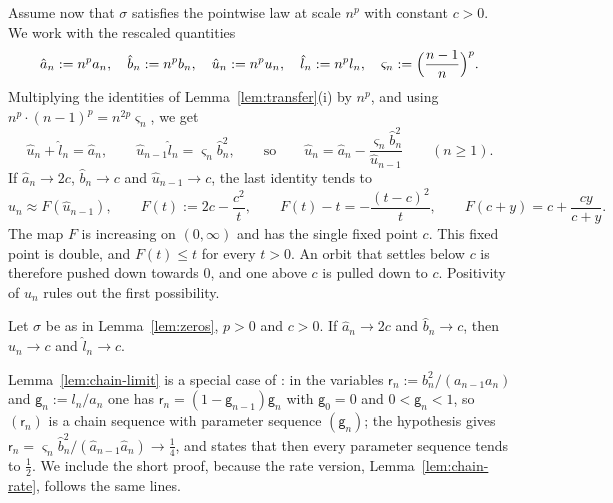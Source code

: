 Assume now that $\sigma$ satisfies the pointwise law at scale $n^p$ with constant $c>0$. We work with the rescaled
quantities
\[
  \hat a_n:=n^pa_n,\quad \hat b_n:=n^pb_n,\quad \hat u_n:=n^pu_n,\quad \hat l_n:=n^pl_n,\quad
  \varsigma_n:=\Bigl(\frac{n-1}n\Bigr)^p .
\]
Multiplying the identities of Lemma~\ref{lem:transfer}(i) by $n^p$, and using $n^p\cdot(n-1)^p=n^{2p}\varsigma_n$, we
get
\begin{equation}\label{eq:scaled-chain}
  \hat u_n+\hat l_n=\hat a_n,\qquad \hat u_{n-1}\hat l_n=\varsigma_n\hat b_n^2,\qquad\text{so}\qquad
  \hat u_n=\hat a_n-\frac{\varsigma_n\hat b_n^2}{\hat u_{n-1}}\qquad(n\ge1).
\end{equation}
If $\hat a_n\to2c$, $\hat b_n\to c$ and $\hat u_{n-1}\to c$, the last identity tends to
\begin{equation}\label{eq:chain-map}
  \hat u_n\approx F(\hat u_{n-1}),\qquad F(t):=2c-\frac{c^2}t,\qquad
  F(t)-t=-\frac{(t-c)^2}t,\qquad F(c+y)=c+\frac{cy}{c+y}.
\end{equation}
The map $F$ is increasing on $(0,\infty)$ and has the single fixed point $c$. This fixed point is double, and
$F(t)\le t$ for every $t>0$. An orbit that settles below $c$ is therefore pushed down towards $0$, and one above $c$ is pulled down
to $c$. Positivity of $u_n$ rules out the first possibility.

\begin{lemma}\label{lem:chain-limit}
Let $\sigma$ be as in Lemma~\ref{lem:zeros}, $p>0$ and $c>0$. If $\hat a_n\to2c$ and $\hat b_n\to c$, then
$\hat u_n\to c$ and $\hat l_n\to c$.
\end{lemma}

Lemma~\ref{lem:chain-limit} is a special case of \cite[Proposition~2.1]{DPQ}: in the variables
$\mathsf r_n:=b_n^2/(a_{n-1}a_n)$ and $\mathsf g_n:=l_n/a_n$ one has $\mathsf r_n=(1-\mathsf g_{n-1})\mathsf g_n$ with
$\mathsf g_0=0$ and $0<\mathsf g_n<1$, so $(\mathsf r_n)$ is a chain sequence with parameter sequence $(\mathsf g_n)$; the
hypothesis gives $\mathsf r_n=\varsigma_n\hat b_n^2/(\hat a_{n-1}\hat a_n)\to\frac14$, and \cite[Proposition~2.1]{DPQ}
states that then every parameter sequence tends to $\frac12$. We include the short proof, because the rate version,
Lemma~\ref{lem:chain-rate}, follows the same lines.

